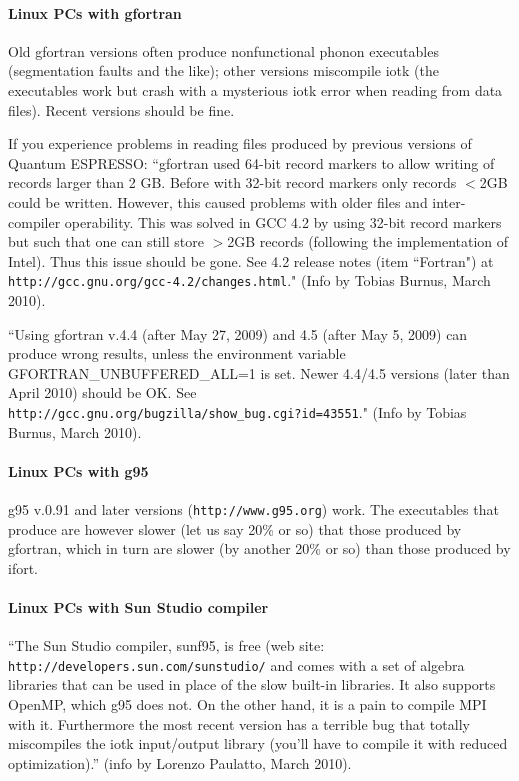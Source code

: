 \documentclass[12pt,a4paper]{article}
\def\qe{{\sc Quantum ESPRESSO}}
\begin{document}
\paragraph{Linux PCs with gfortran}

Old gfortran versions often produce nonfunctional
phonon executables (segmentation faults and the like); other versions
miscompile iotk (the executables work but crash with a mysterious iotk
error when reading from data files). Recent versions should be fine.

If you experience problems in reading files produced by previous versions
of \qe: ``gfortran used 64-bit record markers to allow writing of records 
larger than 2 GB. Before with 32-bit record markers only records $<$2GB 
could be written. However, this caused problems with older files and 
inter-compiler operability. This was solved in GCC 4.2 by using 32-bit 
record markers but such that one can still store $>$2GB records (following 
the implementation of Intel). Thus this issue should be gone. See 4.2 
release notes (item ``Fortran") at 
\texttt{http://gcc.gnu.org/gcc-4.2/changes.html}."
(Info by Tobias Burnus, March 2010).

``Using gfortran v.4.4 (after May 27, 2009) and 4.5 (after May 5, 2009) can 
produce wrong results, unless the environment variable
GFORTRAN\_UNBUFFERED\_ALL=1 is set. Newer 4.4/4.5 versions
(later than April 2010) should be OK. See\\
\texttt{http://gcc.gnu.org/bugzilla/show\_bug.cgi?id=43551}."
(Info by Tobias Burnus, March 2010).

\paragraph{Linux PCs with g95}

g95 v.0.91 and later versions (\texttt{http://www.g95.org}) work. 
The executables that produce are however slower (let us say 20\% or so) 
that those produced by gfortran, which in turn are slower 
(by another 20\% or so) than those produced by ifort.

\paragraph{Linux PCs with Sun Studio compiler}

``The Sun Studio compiler, sunf95, is free (web site:
\texttt{http://developers.sun.com/sunstudio/} and comes  
with a set of algebra libraries that can be used in place of the slow 
built-in libraries. It also supports OpenMP, which g95 does not. On the 
other hand, it is a pain to compile MPI with it. Furthermore the most
recent version has a terrible bug that totally miscompiles the iotk 
input/output library (you'll have to compile it with reduced optimization).''
(info by Lorenzo Paulatto, March 2010).
\end{document}

